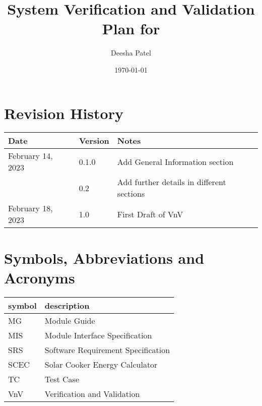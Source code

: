 \documentclass[12pt, titlepage]{article}
\begin{document}
\title{System Verification and Validation Plan for } 
\author{Deesha Patel}
\date{\today}
	
\maketitle


\section{Revision History}

\begin{tabularx}{\textwidth}{p{5cm}p{1.5cm}X}
\toprule {\bf Date} & {\bf Version} & {\bf Notes}\\
\midrule
February 14, 2023 & 0.1.0 & Add General Information section \\
& 0.2 & Add further details in different sections \\

February 18, 2023 & 1.0 & First Draft of VnV \\

\bottomrule
\end{tabularx}

\newpage

\tableofcontents

\listoftables


\newpage

\section{Symbols, Abbreviations and Acronyms}

\renewcommand{\arraystretch}{1.2}
\begin{tabular}{l l} 
  \toprule		
  \textbf{symbol} & \textbf{description}\\
  \midrule 
  MG & Module Guide \\
  MIS & Module Interface Specification \\
  SRS & Software Requirement Specification\\
  SCEC & Solar Cooker Energy Calculator \\ 
  TC & Test Case \\
  VnV & Verification and Validation \\ 
  
  \bottomrule
\end{tabular}\\
\end{document}
